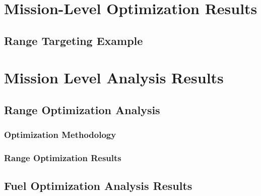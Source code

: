 \documentclass[12pt, a4paper]{report}
\begin{document}

\section{Mission-Level Optimization Results}


\subsection{Range Targeting Example}



\section{Mission Level Analysis Results}



\subsection{Range Optimization Analysis}



\subsubsection{Optimization Methodology}




\subsubsection{Range Optimization Results}



\subsection{Fuel Optimization Analysis Results}

\end{document}
